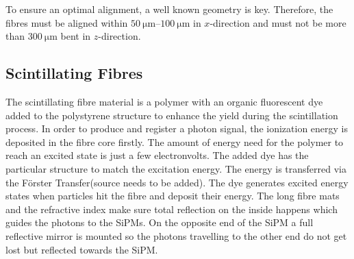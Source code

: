 To ensure an optimal alignment, a well known geometry is key. Therefore, the
fibres must be aligned within $\SIrange{50}{100}{\micro\metre}$ in $x$-direction and must not be more than $\SI{300}{\micro\metre}$ bent in $z$-direction.

\subsection{Scintillating Fibres}
The scintillating fibre material is a polymer with an organic fluorescent dye
added to the polystyrene structure to enhance the yield during the scintillation process.
In order to produce and register a photon signal, the ionization energy is deposited
in the fibre core firstly. The amount of energy need for the polymer to reach an
excited state is just a few electronvolts. The added dye has the particular structure
to match the excitation energy. The energy is transferred via the Förster
Transfer(source needs to be added). The dye generates excited energy states when
particles hit the fibre and deposit their energy.
The long fibre mats and the refractive index make sure total reflection on the inside
happens which guides the photons to the SiPMs. On the opposite end of the SiPM a
full reflective mirror is mounted so the photons travelling to the other end do not
get lost but reflected towards the SiPM.
